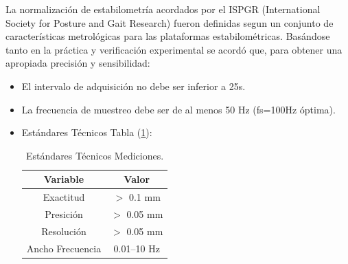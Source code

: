 \documentclass[12pt,a4paper]{article}
\begin{document}
La normalización de estabilometría acordados por el ISPGR (International Society for Posture and Gait Research) fueron definidas segun un conjunto de características metrológicas para las plataformas estabilométricas.
Basándose tanto en la práctica y verificación experimental se acordó que, para obtener una apropiada precisión y sensibilidad:
\begin{itemize}
	\item El intervalo de adquisición no debe ser inferior a 25s.
	\item La frecuencia de muestreo debe ser de al menos 50 Hz (fs=100Hz óptima).
	\item Estándares Técnicos Tabla (\ref{table:mediciones}):
	\begin{table}[H]
		\centering
		
		\begin{tabular}{|c|c|}			
			\hline \textbf{Variable} & \textbf{Valor} 	\\ 
			\hline Exactitud 	& $>$ 0.1 mm 		\\ 
			\hline Presición 	& $>$ 0.05 mm 		\\ 
			\hline Resolución 	& $>$ 0.05 mm 		\\ 
			\hline Ancho Frecuencia & 0.01–10 Hz	\\ 
			\hline 			
		\end{tabular}
		\caption{Estándares Técnicos Mediciones.}
		\label{table:mediciones}
	\end{table}	  
\end{itemize}



\newpage
\end{document}
